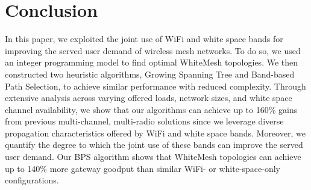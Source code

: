 \section{Conclusion}
\label{sec:conclusion}
In this paper, we exploited the joint use of WiFi and white space bands for 
improving the served user demand of wireless mesh networks.  To do so, we
used an integer programming model to find optimal WhiteMesh topologies.  We
then constructed two heuristic algorithms, Growing Spanning Tree and Band-based
Path Selection, to achieve similar performance with reduced complexity. Through 
extensive analysis across varying offered loads, network sizes, and white space 
channel availability, we show that our algorithms can achieve up to 160\% gains 
from previous multi-channel, multi-radio solutions since we leverage diverse 
propagation characteristics offered by WiFi and white space bands.  Moreover,
we quantify the degree to which the joint use of these bands can improve the served
user demand. Our BPS algorithm shows that WhiteMesh topologies can achieve up to 
140\% more gateway goodput than similar WiFi- or white-space-only configurations.


